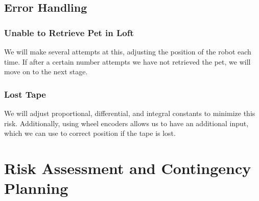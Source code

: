 \documentclass[11pt, oneside]{article} %
\begin{document}
	\subsection{Error Handling}
		\subsubsection{Unable to Retrieve Pet in Loft}
		We will make several attempts at this, adjusting the position of the robot each time. If after a certain number attempts we have not retrieved the pet, we will move on to the next stage.
		\subsubsection{Lost Tape}
		We will adjust proportional, differential, and integral constants to minimize this risk. Additionally, using wheel encoders allows us to have an additional input, which we can use to correct position if the tape is lost.

\newpage
\section{Risk Assessment and Contingency Planning}
\end{document}

